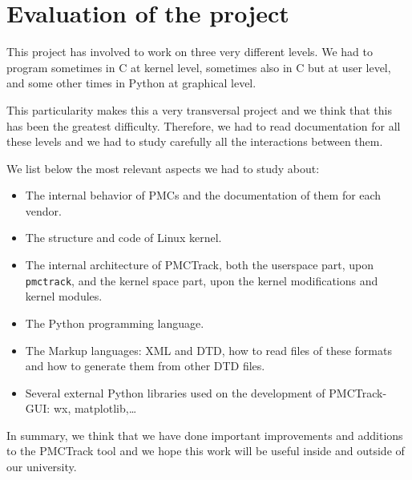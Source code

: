 \section{Evaluation of the project}

This project has involved to work on three very different levels. We had to program sometimes in C at kernel level, sometimes also in C but at user level, and some other times in Python at graphical level.

This particularity makes this a very transversal project and we think that this has been the greatest difficulty. Therefore, we had to read documentation for all these levels and we had to study carefully all the interactions between them.

We list below the most relevant aspects we had to study about:
\begin{itemize}
  \item The internal behavior of PMCs and the documentation of them for each vendor.
  \item The structure and code of Linux kernel.
  \item The internal architecture of PMCTrack, both the userspace part, upon \texttt{pmctrack}, and the kernel space part, upon the kernel modifications and kernel modules.
  \item The Python programming language.
  \item The Markup languages: XML and DTD, how to read files of these formats and how to generate them from other DTD files.
  \item Several external Python libraries used on the development of PMCTrack-GUI: wx, matplotlib,\ldots
\end{itemize}

In summary, we think that we have done important improvements and additions to the PMCTrack tool and we hope this work will be useful inside and outside of our university.

